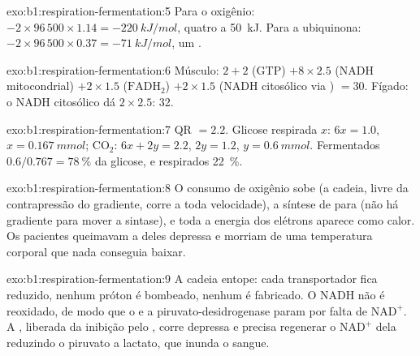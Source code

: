 \begin{solution}{exo:b1:respiration-fermentation:5}
Para o oxigênio: $-2\times 96\,500\times 1.14 = \qty{-220}{kJ/mol}$,
quatro  a \qty{50}{kJ}. Para a ubiquinona: $-2\times 96\,500\times 0.37 =
\qty{-71}{kJ/mol}$, um .
\end{solution}

\begin{solution}{exo:b1:respiration-fermentation:6}
Músculo: $2 + 2$ (GTP) $+ 8\times 2.5$ (NADH mitocondrial) $+ 2\times
1.5$ ($\mathrm{FADH_2}$) $+ 2\times 1.5$ (NADH citosólico via ) $=
30$. Fígado: o NADH citosólico dá $2\times 2.5$: 32.
\end{solution}

\begin{solution}{exo:b1:respiration-fermentation:7}
QR $= 2.2$. Glicose respirada $x$: $6x = 1.0$, $x = \qty{0.167}{mmol}$;
$\mathrm{CO_2}$: $6x + 2y = 2.2$, $2y = 1.2$, $y = \qty{0.6}{mmol}$.
Fermentados $0.6/0.767 = \qty{78}{\%}$ da glicose, e respirados
\qty{22}{\%}.
\end{solution}

\begin{solution}{exo:b1:respiration-fermentation:8}
O consumo de oxigênio sobe (a cadeia, livre da contrapressão do
gradiente, corre a toda velocidade), a síntese de  para (não há
gradiente para mover a sintase), e toda a energia dos elétrons aparece
como calor. Os pacientes queimavam a  deles depressa e morriam de
uma temperatura corporal que nada conseguia baixar.
\end{solution}

\begin{solution}{exo:b1:respiration-fermentation:9}
A cadeia entope: cada transportador fica reduzido, nenhum próton é
bombeado, nenhum  é fabricado. O NADH não é reoxidado, de modo que o
 e a piruvato-desidrogenase param por falta de
$\mathrm{NAD^+}$. A , liberada da inibição pelo , corre
depressa e precisa regenerar o $\mathrm{NAD^+}$ dela reduzindo o
piruvato a lactato, que inunda o sangue.
\end{solution}

